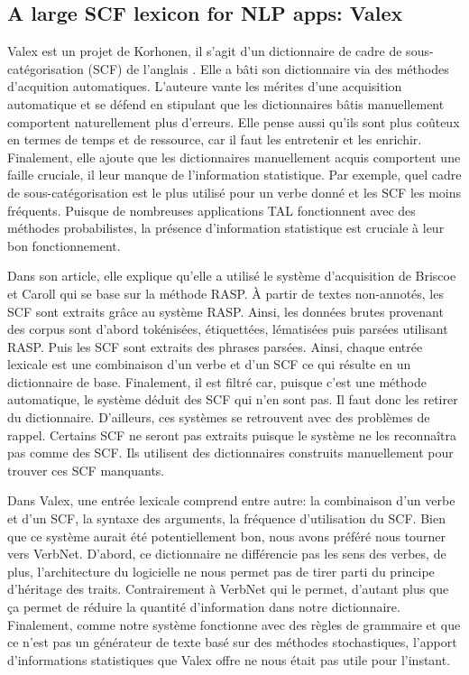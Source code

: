 \subsection{A large SCF lexicon for NLP apps: Valex}
 
Valex est un projet de Korhonen, il s'agit d'un dictionnaire de cadre de sous-catégorisation (SCF) de l'anglais \citep{Korhonenlargesubcategorizationlexicon2006}. Elle a bâti son dictionnaire via des méthodes d'acquition automatiques. L'auteure vante les mérites d'une acquisition automatique et se défend en stipulant que les dictionnaires bâtis manuellement comportent naturellement plus d'erreurs. Elle pense aussi qu'ils sont plus coûteux en termes de temps et de ressource, car il faut les entretenir et les enrichir. Finalement, elle ajoute que les dictionnaires manuellement acquis comportent une faille cruciale, il leur manque de l'information statistique. Par exemple, quel cadre de sous-catégorisation est le plus utilisé pour un verbe donné et les SCF les moins fréquents.  Puisque de nombreuses applications TAL fonctionnent avec des méthodes probabilistes, la présence d'information statistique est cruciale à leur bon fonctionnement.  

Dans son article, elle explique qu'elle a utilisé le système d'acquisition de Briscoe et Caroll \citep{BriscoeSecondReleaseRASP2006} qui se base sur la méthode RASP. À partir de textes non-annotés, les SCF sont extraits grâce au système RASP. Ainsi, les données brutes provenant des corpus sont d'abord tokénisées, étiquettées, lématisées puis parsées utilisant RASP. Puis les SCF sont extraits des phrases parsées. Ainsi, chaque entrée lexicale est une combinaison d'un verbe et d'un SCF ce qui résulte en un dictionnaire de base. Finalement, il est filtré car, puisque c'est une méthode automatique, le système déduit des SCF qui n'en sont pas. Il faut donc les retirer du dictionnaire. D'ailleurs, ces systèmes se retrouvent avec des problèmes de rappel. Certains SCF ne seront pas extraits puisque le système ne les reconnaîtra pas comme des SCF. Ils utilisent des dictionnaires construits manuellement pour trouver ces SCF manquants.

Dans Valex, une entrée lexicale comprend entre autre: la combinaison d'un verbe et d'un SCF, la syntaxe des arguments, la fréquence d'utilisation du SCF. Bien que ce système aurait été potentiellement bon, nous avons préféré nous tourner vers VerbNet. D'abord, ce dictionnaire ne différencie pas les sens des verbes, de plus, l'architecture du logicielle ne nous permet pas de tirer parti du principe d'héritage des traits. Contrairement à VerbNet qui le permet, d'autant plus que ça permet de réduire la quantité d'information dans notre dictionnaire. Finalement, comme notre système fonctionne avec des règles de grammaire et que ce n'est pas un générateur de texte basé sur des méthodes stochastiques, l'apport d'informations statistiques que Valex offre ne nous était pas utile pour l'instant.

